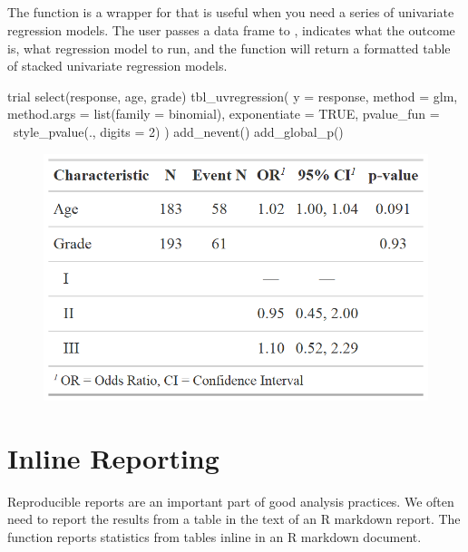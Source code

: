 \subsection{\texorpdfstring{}{tbl\_uvregression()}}

The  function is a wrapper for  that is useful when you need a series of univariate regression models.
The user passes a data frame to , indicates what the outcome is, what regression model to run, and the function will return a formatted table of stacked univariate regression models.

\newpage
\begin{example}
trial %
  select(response, age, grade) %
  tbl_uvregression(
    y = response, 
    method = glm,
    method.args = list(family = binomial),
    exponentiate = TRUE,
    pvalue_fun = ~style_pvalue(., digits = 2)
  ) %
  add_nevent() %
  add_global_p()
\end{example}

\begin{figure}[h!]
  \includegraphics[scale=0.35]{uvregression.png}
  \centering
\end{figure}

\section{Inline Reporting}

Reproducible reports are an important part of good analysis practices.
We often need to report the results from a table in the text of an R markdown report.
The  function reports statistics from  tables inline in an R markdown document.

